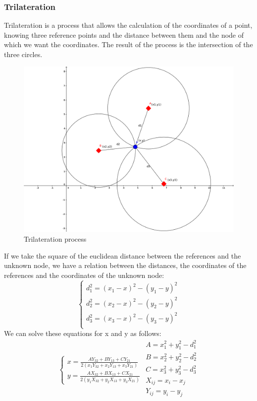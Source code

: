\documentclass[a4paper,10pt]{article}
\begin{document}
\subsubsection{Trilateration}
Trilateration is a process that allows the calculation of the coordinates of a point, knowing three reference points and the distance between them
and the node of which we want the coordinates. The result of the process is the intersection of the three circles.\\
\begin{figure}[H]
  \centering
 \includegraphics[scale=0.7]{trilateration.png}
  \caption{Trilateration process}
\end{figure}
\noindent
If we take the square of the euclidean distance between the references and the unknown node, we have a relation between the distances, the 
coordinates of the references and the coordinates of the unknown node: 
$$
\left\{
    \begin{array}{l}
     d_1^2 = (x_1 - x)^2 - (y_1 - y)^2 \\
     d_2^2 = (x_2 - x)^2 - (y_2 - y)^2 \\
     d_3^2 = (x_3 - x)^2 - (y_3 - y)^2 \\
    \end{array}
\right.
$$
We can solve these equations for x and y as follows:
$$
\left\{
    \begin{array}{l}
     x = \frac{AY_{32} + BY_{13} + CY_{21}}{2(x_1Y_{32} + x_2Y_{13} + x_3Y_{21})}\\
     y = \frac{AX_{32} + BX_{13} + CX_{21}}{2(y_1X_{32} + y_2X_{13} + y_3X_{21})}
    \end{array}
\right.
\begin{array}{l}
  A = x_1^2 + y_1^2 - d_1^2 \\
  B = x_2^2 + y_2^2 - d_2^2 \\
  C = x_3^2 + y_3^2 - d_3^2 \\
  X_{ij} = x_i - x_j \\ 
  Y_{ij} = y_i - y_j \\
\end{array}
$$
\end{document}
